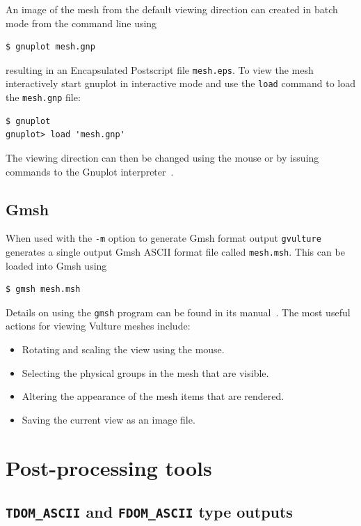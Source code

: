 \documentclass[onecolumn,a4paper]{article}
\numberwithin{equation}{section}
\begin{document}
An image of the mesh from the default viewing direction can created in batch mode from the
command line using
\begin{verbatim}
$ gnuplot mesh.gnp
\end{verbatim}
resulting in an Encapsulated Postscript file \texttt{mesh.eps}. To view the mesh
interactively start gnuplot in interactive mode and use the \texttt{load} command
to load the \texttt{mesh.gnp} file:
\begin{verbatim}
$ gnuplot
gnuplot> load 'mesh.gnp'
\end{verbatim}
The viewing direction can then be changed using the mouse or by issuing commands 
to the Gnuplot interpreter~\cite{gnuplotman}.

\subsection{Gmsh}

When used with the \texttt{-m} option to generate Gmsh format output \texttt{gvulture} 
generates a single output Gmsh ASCII format file called \texttt{mesh.msh}. This can 
be loaded into Gmsh using
\begin{verbatim}
$ gmsh mesh.msh
\end{verbatim}
Details on using the \texttt{gmsh} program can be found in its manual~\cite{gmshman}.
The most useful actions for viewing Vulture meshes include:
\begin{itemize}
 \item Rotating and scaling the view using the mouse.
 \item Selecting the physical groups in the mesh that are visible.
 \item Altering the appearance of the mesh items that are rendered.
 \item Saving the current view as an image file.
\end{itemize}

%
%
\section{Post-processing tools}
%
%

\subsection{\texttt{TDOM\_ASCII} and \texttt{FDOM\_ASCII} type outputs}
\label{sc:asciipp}
\end{document}
